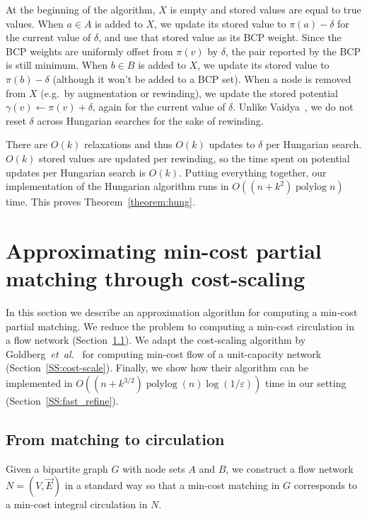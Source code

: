 \documentclass[11pt,twoside]{article}
\def\etal{\emph{et~al.}}
\def\etal{\textit{et~al.}}
\def\polylog{\mathop{\mathrm{polylog}}}
\def\eps{\varepsilon}
\def\Paren#1{\left( #1 \right)}		%
\theoremstyle{plain}
\numberwithin{figure}{section}
\begin{document}
At the beginning of the algorithm, $X$ is empty and stored values are equal to
true values.
When $a \in A$ is added to $X$, we update its stored value to $\pi(a) - \delta$
for the current value of $\delta$, and use that stored value as its BCP weight.
Since the BCP weights are uniformly offset from $\pi(v)$ by $\delta$, the pair
reported by the BCP is still minimum.
When $b \in B$ is added to $X$, we update its stored value to $\pi(b) - \delta$
(although it won't be added to a BCP set).
When a node is removed from $X$ (e.g.\ by augmentation or rewinding), we update
the stored potential $\gamma(v) \gets \pi(v) + \delta$, again for the current
value of $\delta$.
Unlike Vaidya~\cite{Vaidya89}, we do not reset $\delta$ across Hungarian searches
for the sake of rewinding.

There are $O(k)$ relaxations and thus $O(k)$ updates to $\delta$ per Hungarian search.
$O(k)$ stored values are updated per rewinding, so the time spent on potential
updates per Hungarian search is $O(k)$.
Putting everything together, our implementation of the Hungarian algorithm runs
in $O((n + k^2)\polylog n)$ time.
This proves Theorem~\ref{theorem:hung}.


\section{Approximating min-cost partial matching through cost-scaling}
\label{section:goldberg}

In this section we describe an approximation algorithm for computing a min-cost
partial matching.
We reduce the problem to computing a min-cost circulation in a flow network
(Section~\ref{SS:match-flow-red}).
We adapt the cost-scaling algorithm by Goldberg~\etal~\cite{GHKT17} for
computing min-cost flow of a unit-capacity network (Section~\ref{SS:cost-scale}).
Finally, we show how their algorithm can be implemented in
$O\Paren{(n + k^{3/2})\polylog(n)\log(1/\eps)}$ time in our setting (Section~\ref{SS:fast_refine}).

\subsection{From matching to circulation}
\label{SS:match-flow-red}

Given a bipartite graph $G$ with node sets $A$ and $B$, we construct a flow network
$N = (V, \vec{E})$ in a standard way \cite{RT12}
so that a min-cost matching in $G$ corresponds to a min-cost integral
circulation in $N$.
\end{document}
